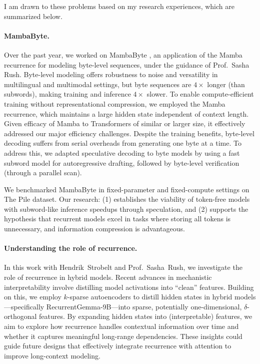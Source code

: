I am drawn to these problems based on my research experiences, which are summarized below.

\paragraph{MambaByte.}

Over the past year, we worked on MambaByte \citep{wang_mambabyte_2024}, an application of the Mamba recurrence \citep{gu_mamba_2024} for modeling byte-level sequences, under the guidance of Prof.~Sasha Rush.
%
Byte-level modeling offers robustness to noise and versatility in multilingual and multimodal settings, but byte sequences are $4\times$ longer (than subwords), making training and inference $4\times$ slower.
%
To enable compute-efficient training without representational compression, we employed the Mamba recurrence, which maintains a large hidden state independent of context length.
%
Given efficacy of Mamba to Transformers of similar or larger size, it effectively addressed our major efficiency challenges.
%
Despite the training benefits, byte-level decoding suffers from serial overheads from generating one byte at a time.
%
To address this, we adapted speculative decoding \citep{leviathan_fast_2023} to byte models by using a fast subword model for autoregressive drafting, followed by byte-level verification (through a parallel scan).

We benchmarked MambaByte in fixed-parameter and fixed-compute settings on The Pile dataset.
%
Our research: (1) establishes the viability of token-free models with subword-like inference speedups through speculation, and (2) supports the hypothesis that recurrent models excel in tasks where storing all tokens is unnecessary, and information compression is advantageous.


\paragraph{Understanding the role of recurrence.}

In this work with Hendrik~Strobelt and Prof.~Sasha~Rush, we investigate the role of recurrence in hybrid models.
%
Recent advances in mechanistic interpretability involve distilling model activations into ``clean'' features.
%
Building on this, we employ $k$-sparse autoencoders to distill hidden states in hybrid models---specifically RecurrentGemma-9B---into sparse, potentially one-dimensional, $\delta$-orthogonal features.
%
By expanding hidden states into (interpretable) features, we aim to explore how recurrence handles contextual information over time and whether it captures meaningful long-range dependencies.
% 
These insights could guide future designs that effectively integrate recurrence with attention to improve long-context modeling.

